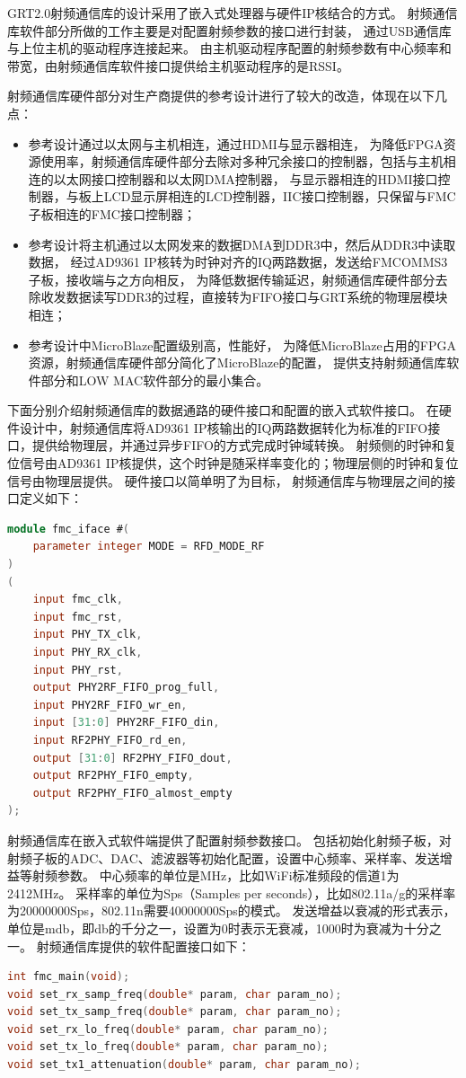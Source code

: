 		GRT2.0射频通信库的设计采用了嵌入式处理器与硬件IP核结合的方式。
		射频通信库软件部分所做的工作主要是对配置射频参数的接口进行封装，
		通过USB通信库与上位主机的驱动程序连接起来。
		由主机驱动程序配置的射频参数有中心频率和带宽，由射频通信库软件接口提供给主机驱动程序的是RSSI。

		射频通信库硬件部分对生产商提供的参考设计进行了较大的改造，体现在以下几点：
			\begin{itemize}
				\item 参考设计通过以太网与主机相连，通过HDMI与显示器相连，
				为降低FPGA资源使用率，射频通信库硬件部分去除对多种冗余接口的控制器，包括与主机相连的以太网接口控制器和以太网DMA控制器，
				与显示器相连的HDMI接口控制器，与板上LCD显示屏相连的LCD控制器，IIC接口控制器，只保留与FMC子板相连的FMC接口控制器；
				\item 参考设计将主机通过以太网发来的数据DMA到DDR3中，然后从DDR3中读取数据，
				经过AD9361 IP核转为时钟对齐的IQ两路数据，发送给FMCOMMS3子板，接收端与之方向相反，
				为降低数据传输延迟，射频通信库硬件部分去除收发数据读写DDR3的过程，直接转为FIFO接口与GRT系统的物理层模块相连；
				\item 参考设计中MicroBlaze配置级别高，性能好，
				为降低MicroBlaze占用的FPGA资源，射频通信库硬件部分简化了MicroBlaze的配置，
				提供支持射频通信库软件部分和LOW MAC软件部分的最小集合。
			\end{itemize}

		下面分别介绍射频通信库的数据通路的硬件接口和配置的嵌入式软件接口。
		在硬件设计中，射频通信库将AD9361 IP核输出的IQ两路数据转化为标准的FIFO接口，提供给物理层，并通过异步FIFO的方式完成时钟域转换。
		射频侧的时钟和复位信号由AD9361 IP核提供，这个时钟是随采样率变化的；物理层侧的时钟和复位信号由物理层提供。
		硬件接口以简单明了为目标，
		射频通信库与物理层之间的接口定义如下：
		\begin{lstlisting}[language={Verilog}]
module fmc_iface #(
	parameter integer MODE = RFD_MODE_RF
)
(
	input fmc_clk,
	input fmc_rst,
	input PHY_TX_clk,
	input PHY_RX_clk,
	input PHY_rst,
	output PHY2RF_FIFO_prog_full,
	input PHY2RF_FIFO_wr_en,
	input [31:0] PHY2RF_FIFO_din,
	input RF2PHY_FIFO_rd_en,
	output [31:0] RF2PHY_FIFO_dout,
	output RF2PHY_FIFO_empty,
	output RF2PHY_FIFO_almost_empty
);
		\end{lstlisting}

		射频通信库在嵌入式软件端提供了配置射频参数接口。
		包括初始化射频子板，对射频子板的ADC、DAC、滤波器等初始化配置，设置中心频率、采样率、发送增益等射频参数。
		中心频率的单位是MHz，比如WiFi标准频段的信道1为2412MHz。
		采样率的单位为Sps（Samples per seconds），比如802.11a/g的采样率为20000000Sps，802.11n需要40000000Sps的模式。
		发送增益以衰减的形式表示，单位是mdb，即db的千分之一，设置为0时表示无衰减，1000时为衰减为十分之一。
		射频通信库提供的软件配置接口如下：
		\begin{lstlisting}[language={C}]
int fmc_main(void);
void set_rx_samp_freq(double* param, char param_no);
void set_tx_samp_freq(double* param, char param_no);
void set_rx_lo_freq(double* param, char param_no);
void set_tx_lo_freq(double* param, char param_no);
void set_tx1_attenuation(double* param, char param_no);
		\end{lstlisting}

